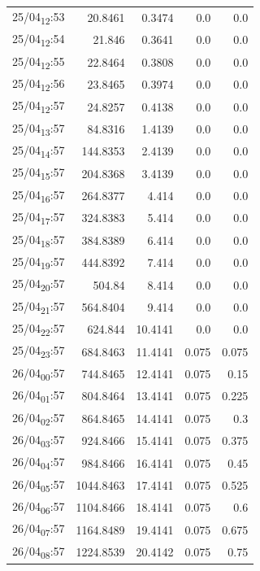 \documentclass[11pt]{article}
\begin{document}
\begin{table}[htbp]
\begin{tabular}{lrrrr}
25/04\textsubscript{12}:53 & 20.8461 & 0.3474 & 0.0 & 0.0\\[0pt]
25/04\textsubscript{12}:54 & 21.846 & 0.3641 & 0.0 & 0.0\\[0pt]
25/04\textsubscript{12}:55 & 22.8464 & 0.3808 & 0.0 & 0.0\\[0pt]
25/04\textsubscript{12}:56 & 23.8465 & 0.3974 & 0.0 & 0.0\\[0pt]
25/04\textsubscript{12}:57 & 24.8257 & 0.4138 & 0.0 & 0.0\\[0pt]
25/04\textsubscript{13}:57 & 84.8316 & 1.4139 & 0.0 & 0.0\\[0pt]
25/04\textsubscript{14}:57 & 144.8353 & 2.4139 & 0.0 & 0.0\\[0pt]
25/04\textsubscript{15}:57 & 204.8368 & 3.4139 & 0.0 & 0.0\\[0pt]
25/04\textsubscript{16}:57 & 264.8377 & 4.414 & 0.0 & 0.0\\[0pt]
25/04\textsubscript{17}:57 & 324.8383 & 5.414 & 0.0 & 0.0\\[0pt]
25/04\textsubscript{18}:57 & 384.8389 & 6.414 & 0.0 & 0.0\\[0pt]
25/04\textsubscript{19}:57 & 444.8392 & 7.414 & 0.0 & 0.0\\[0pt]
25/04\textsubscript{20}:57 & 504.84 & 8.414 & 0.0 & 0.0\\[0pt]
25/04\textsubscript{21}:57 & 564.8404 & 9.414 & 0.0 & 0.0\\[0pt]
25/04\textsubscript{22}:57 & 624.844 & 10.4141 & 0.0 & 0.0\\[0pt]
25/04\textsubscript{23}:57 & 684.8463 & 11.4141 & 0.075 & 0.075\\[0pt]
26/04\textsubscript{00}:57 & 744.8465 & 12.4141 & 0.075 & 0.15\\[0pt]
26/04\textsubscript{01}:57 & 804.8464 & 13.4141 & 0.075 & 0.225\\[0pt]
26/04\textsubscript{02}:57 & 864.8465 & 14.4141 & 0.075 & 0.3\\[0pt]
26/04\textsubscript{03}:57 & 924.8466 & 15.4141 & 0.075 & 0.375\\[0pt]
26/04\textsubscript{04}:57 & 984.8466 & 16.4141 & 0.075 & 0.45\\[0pt]
26/04\textsubscript{05}:57 & 1044.8463 & 17.4141 & 0.075 & 0.525\\[0pt]
26/04\textsubscript{06}:57 & 1104.8466 & 18.4141 & 0.075 & 0.6\\[0pt]
26/04\textsubscript{07}:57 & 1164.8489 & 19.4141 & 0.075 & 0.675\\[0pt]
26/04\textsubscript{08}:57 & 1224.8539 & 20.4142 & 0.075 & 0.75\\[0pt]

\end{tabular}
\end{table}
\end{document}
